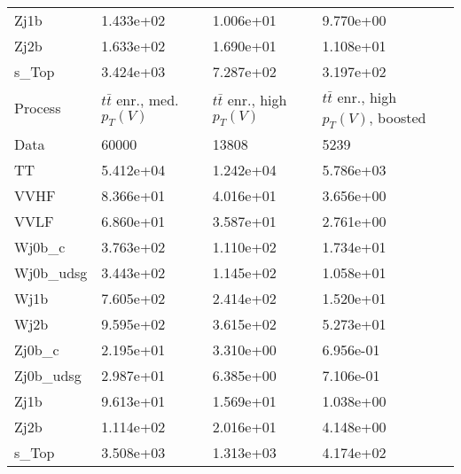 \begin{table}
{\begin{tabularx}{0.8\textwidth}{|X|X|X|X|}
Zj1b & 1.433e+02 & 1.006e+01 & 9.770e+00 \\
Zj2b & 1.633e+02 & 1.690e+01 & 1.108e+01 \\
s\_Top & 3.424e+03 & 7.287e+02 & 3.197e+02 \\
\hline
\hline
Process & $t\bar{t}$ enr., med. $p_{T}(V)$ & $t\bar{t}$ enr., high $p_{T}(V)$ & $t\bar{t}$ enr., high $p_{T}(V)$, boosted \\
\hline
Data & 60000 & 13808 & 5239 \\
\hline
TT & 5.412e+04 & 1.242e+04 & 5.786e+03 \\
VVHF & 8.366e+01 & 4.016e+01 & 3.656e+00 \\
VVLF & 6.860e+01 & 3.587e+01 & 2.761e+00 \\
Wj0b\_c & 3.763e+02 & 1.110e+02 & 1.734e+01 \\
Wj0b\_udsg & 3.443e+02 & 1.145e+02 & 1.058e+01 \\
Wj1b & 7.605e+02 & 2.414e+02 & 1.520e+01 \\
Wj2b & 9.595e+02 & 3.615e+02 & 5.273e+01 \\
Zj0b\_c & 2.195e+01 & 3.310e+00 & 6.956e-01 \\
Zj0b\_udsg & 2.987e+01 & 6.385e+00 & 7.106e-01 \\
Zj1b & 9.613e+01 & 1.569e+01 & 1.038e+00 \\
Zj2b & 1.114e+02 & 2.016e+01 & 4.148e+00 \\
s\_Top & 3.508e+03 & 1.313e+03 & 4.174e+02 \\
\hline
\end{tabularx}
}
\label{tab:cr-Wmn-2017}
\end{table}

